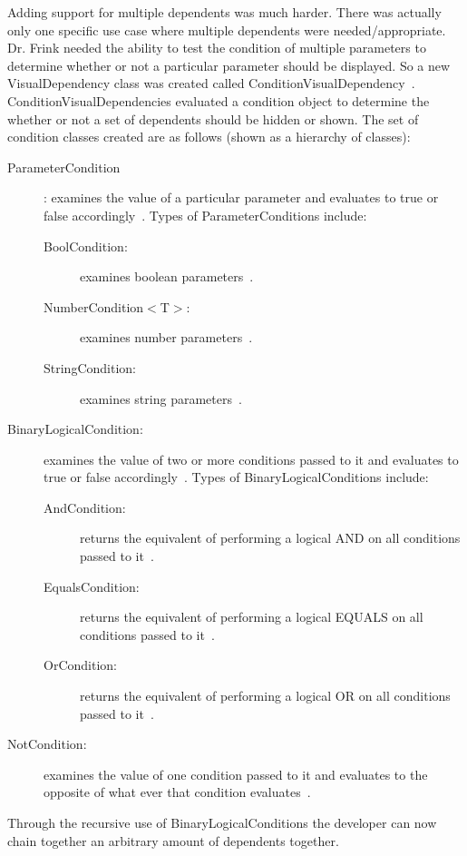 Adding support for multiple dependents was much harder. There was actually only one specific use case where multiple dependents were needed/appropriate. Dr.
Frink needed the ability to test the condition of multiple parameters to determine whether or not a particular parameter should be displayed.
So a new VisualDependency class was created called ConditionVisualDependency~\cite{ConditionVisualDependency}. ConditionVisualDependencies evaluated a condition object to
determine the whether or not a set of dependents should be hidden or shown. The set of condition classes created are as follows (shown as a hierarchy of classes):
\begin{description}
	\item[ParameterCondition]: examines the value of a particular parameter and evaluates to true or false accordingly~\cite{ParameterCondition}. Types of ParameterConditions include:
	\begin{description}
		\item[BoolCondition:] examines boolean parameters~\cite{BoolCondition}.
		\item[NumberCondition$<$T$>$:] examines number parameters~\cite{NumberCondition}.
		\item[StringCondition:] examines string parameters~\cite{StringCondition}.
	\end{description}
	\item[BinaryLogicalCondition:] examines the value of two or more conditions passed to it and evaluates to true or false accordingly~\cite{BinaryLogicalCondition}. Types of BinaryLogicalConditions include:
	\begin{description}
		\item[AndCondition:] returns the equivalent of performing a logical AND on all conditions passed to it~\cite{AndCondition}.
		\item[EqualsCondition:] returns the equivalent of performing a logical EQUALS on all conditions passed to it~\cite{EqualsCondition}.
		\item[OrCondition:] returns the equivalent of performing a logical OR on all conditions passed to it~\cite{OrCondition}.
	\end{description}
	\item[NotCondition:] examines the value of one condition passed to it and evaluates to the opposite of what ever that condition evaluates~\cite{NotCondition}.
\end{description}
Through the recursive use of BinaryLogicalConditions the developer can now chain together an arbitrary amount of dependents together.

